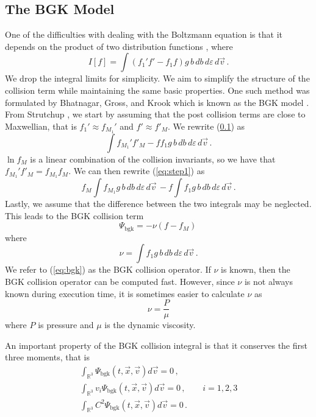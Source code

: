 \documentclass[12pt]{CSUNthesis}
\newcommand{\vecv}{\vec{v}}
\begin{document}
\subsection{The BGK Model}
\label{eq:coll_bgk_sec}
One of the difficulties with dealing with the Boltzmann equation is that it depends on the product of two distribution functions \cite{Kremer2010}, where
\begin{equation}
I[f] = \int(f_1' f' - f_1 f) g\, b \, db\, d\varepsilon\, d\vecv\, .
\end{equation}
We drop the integral limits for simplicity. We aim to simplify the structure of the collision term while maintaining the same basic properties. One such method was formulated by Bhatnagar, Gross, and Krook which is known as the BGK model \cite{BGK54}. From Strutchup \cite{Struchtrup2005}, we start by assuming that the post collision terms are close to Maxwellian, that is $f_1' \approx f_{M_1}'$ and $f' \approx f'_{M}$. We rewrite (\ref{eq:coll_bgk_sec}) as
\begin{equation}
\label{eq:bgk_step1}
\int  f_{M_1}' f'_{M} - f f_1 g\, b \, db\, d\varepsilon\, d\vecv\, .
\end{equation}
$\ln f_M$ is a linear combination of the collision invariants, so we have that $f_{M_1}' f'_{M}=f_{M_1} f_{M}$. We can then rewrite (\ref{eq:step1}) as 
\begin{equation}
\label{eq:bgk_step2}
f_M \int f_{M_1} g\, b \, db\, d\varepsilon\, d\vecv\, - f \int f_1 g\, b \, db\, d\varepsilon\, d\vecv\, .
\end{equation}
Lastly, we assume that the difference between the two integrals may be neglected. This leads to the BGK collision term
\begin{equation}
\label{eq:bgk}
\Psi_{\text{bgk}} = -\nu(f-f_M)\, 
\end{equation}
where
\begin{equation}
\nu = \int f_1 g\, b \, db\, d\varepsilon\, d\vecv\, .
\end{equation}
We refer to (\ref{eq:bgk}) as the BGK collision operator. If $\nu$ is known, then the BGK collision operator can be computed fast. However, since $\nu$ is not always known during execution time, it is sometimes easier to calculate $\nu$ as
\begin{equation}
\nu = \frac{P}{\mu}
\end{equation}
where $P$ is pressure and $\mu$ is the dynamic viscosity.

An important property of the BGK collision integral is that it conserves the first three moments, that is
\begin{equation}
\label{eq:bgk_conservative}
\begin{split}
	\int_{\mathbb{R}^3}  \Psi_{\text{bgk}}(t,\vec{x},\vec{v}) d\vec{v} = 0\, , & \\
	\int_{\mathbb{R}^3} v_i \Psi_{\text{bgk}}(t,\vec{x},\vec{v}) d\vec{v} = 0\, , & \quad i=1,2,3  \\
	\int_{\mathbb{R}^3} C^2 \Psi_{\text{bgk}}(t,\vec{x},\vec{v}) d\vec{v} = 0 \, .&
\end{split}
\end{equation}
\end{document}
